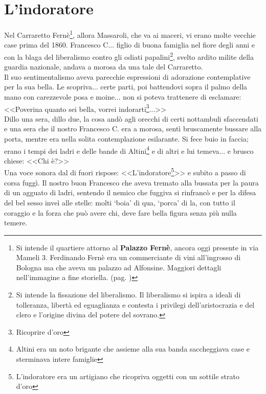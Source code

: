 
\chapter{L'indoratore}
Nel Carraretto Fernè\footnote{Si intende il quartiere attorno al \textbf{Palazzo Fernè}, ancora oggi presente in via Mameli 3. Ferdinando Fernè era un commerciante di vini all'ingrosso di Bologna ma che aveva un palazzo ad Alfonsine. Maggiori dettagli nell'immagine a fine storiella. (pag. \pageref{fig:fernè})}, allora Massaroli, che va ai maceri, vi erano molte vecchie case prima del 1860. Francesco C... figlio di buona famiglia nel fiore degli anni e con la blaga del liberalismo contro gli odiati papalini\footnote{Si intende la fissazione del liberalismo. Il liberalismo si ispira a ideali di tolleranza, libertà ed eguaglianza e contesta i privilegi dell'aristocrazia e del clero e l'origine divina del potere del sovrano.}, svelto ardito milite della guardia nazionale, andava a morosa da una tale del Carraretto. \\
Il suo sentimentalismo aveva parecchie espressioni di adorazione contemplative per la sua bella.
Le scopriva... certe parti, poi battendovi sopra il palmo della mano con carezzevole posa e moine... non si poteva trattenere di esclamare:\\
\indent <<Poverina quanto sei bella, vorrei indorarti\footnote{Ricoprire d'oro}...>>\\
Dillo una sera, dillo due, la cosa andò agli orecchi di certi nottambuli sfaccendati e una sera che il nostro Francesco C. era a morosa, sentì bruscamente bussare alla porta, mentre era nella solita contemplazione esilarante.
Si fece buio in faccia; erano i tempi dei ladri e delle bande di Altini\footnote{Altini era un noto brigante che assieme alla sua banda saccheggiava case e sterminava intere famiglie} e di altri e lui temeva... e brusco chiese: <<Chi è?>>\\
Una voce sonora dal di fuori rispose: <<L'indoratore\footnote{L'indoratore era un artigiano che ricopriva oggetti con un sottile strato d'oro}>> e subito a passo di corsa fuggì.
Il nostro buon Francesco che aveva tremato alla bussata per la paura di un agguato di ladri, sentendo il nemico che fuggiva si rinfrancò e per la difesa del bel sesso inveì alle stelle: molti ‘boia' di qua, ‘porca' di la, con tutto il coraggio e la forza che può avere chi, deve fare bella figura senza più nulla temere.


